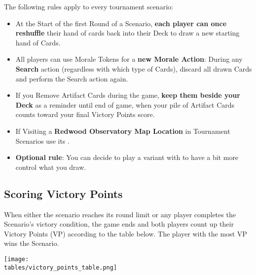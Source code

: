 \begin{multicols*}{2}
The following rules apply to every tournament scenario:
\begin{itemize}
    \item At the Start of the first Round of a Scenario, \textbf{each player can once reshuffle} their hand of cards back into their Deck to draw a new starting hand of Cards.
    \item All players can use Morale Tokens for a \textbf{new Morale Action}: During any \textbf{Search} action (regardless with which type of Cards), discard all drawn Cards and perform the Search action again.
    \item If you Remove Artifact Cards during the game, \textbf{keep them beside your Deck} as a reminder until end of game, when your pile of Artifact Cards counts toward your final Victory Points score.
    \item If Visiting a \textbf{Redwood Observatory Map Location} in Tournament Scenarios use its .
    \item \textbf{Optional rule}: You can decide to play a variant with  to have a bit more control what you draw.
\end{itemize}

\subsection*{Scoring Victory Points}
When either the scenario reaches its round limit or any player completes the Scenario's victory condition, the game ends and both players count up their Victory Points (VP) according to the table below.
The player with the most VP wins the Scenario.

\texttt{[image: \\tables/victory\_points\_table.png]}



\end{multicols*}
